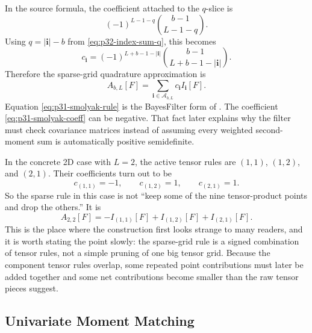 \documentclass[11pt]{article}
\numberwithin{equation}{section}
\begin{document}
In the source formula, the coefficient attached to the \(q\)-slice is
\[
  (-1)^{L-1-q}\binom{b-1}{L-1-q}.
\]
Using \(q=|\mathbf i|-b\) from \eqref{eq:p32-index-sum-q}, this becomes
\begin{equation}
  c_{\mathbf i}
  =
  (-1)^{L+b-1-|\mathbf i|}
  \binom{b-1}{L+b-1-|\mathbf i|}.
  \label{eq:p31-smolyak-coeff}
\end{equation}
Therefore the sparse-grid quadrature approximation is
\begin{equation}
  A_{b,L}[F]
  =
  \sum_{\mathbf i\in\mathcal A_{b,L}}
  c_{\mathbf i}I_{\mathbf i}[F].
  \label{eq:p31-smolyak-rule}
\end{equation}
Equation \eqref{eq:p31-smolyak-rule} is the BayesFilter form of
\citet[Eq. 26--29]{jia2012sparsegrid}.  The coefficient
\eqref{eq:p31-smolyak-coeff} can be negative.  That fact later explains why
the filter must check covariance matrices instead of assuming every weighted
second-moment sum is automatically positive semidefinite.

In the concrete 2D case with \(L=2\), the active tensor rules are
\((1,1)\), \((1,2)\), and \((2,1)\).  Their coefficients turn out to be
\begin{equation}
  c_{(1,1)}=-1,
  \qquad
  c_{(1,2)}=1,
  \qquad
  c_{(2,1)}=1.
  \label{eq:p36-2d-smolyak-coeffs}
\end{equation}
So the sparse rule in this case is not ``keep some of the nine tensor-product
points and drop the others.''  It is
\begin{equation}
  A_{2,2}[F] = -I_{(1,1)}[F] + I_{(1,2)}[F] + I_{(2,1)}[F].
  \label{eq:p36-2d-smolyak-rule}
\end{equation}
This is the place where the construction first looks strange to many readers,
and it is worth stating the point slowly: the sparse-grid rule is a signed
combination of tensor rules, not a simple pruning of one big tensor grid.
Because the component tensor rules overlap, some repeated point contributions
must later be added together and some net contributions become smaller than the
raw tensor pieces suggest.

\subsection{Univariate Moment Matching}
\label{subsec:p32-univariate-moment-matching}
\end{document}
